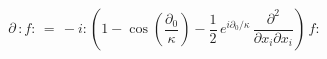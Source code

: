 \begin{equation}\label{39}
  \partial\, :f:\,= \,-i :\left( 1 -\cos\left(\frac{\partial_0}\kappa\right) - \frac12\,
e^{i\partial_0/\kappa}\, \frac{\partial^2}{\partial x_i\partial x_i}\right)\,
f:
\end{equation}

